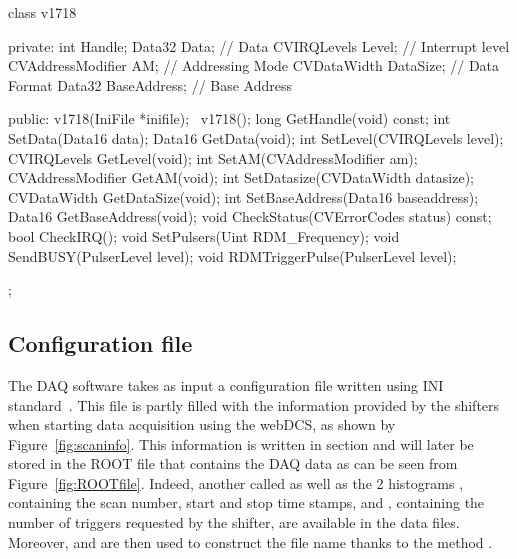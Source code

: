 	\begin{code}
    \begin{cppcode}
class v1718{
    private:
        int               Handle;
        Data32            Data;           // Data
        CVIRQLevels       Level;          // Interrupt level
        CVAddressModifier AM;             // Addressing Mode
        CVDataWidth       DataSize;       // Data Format
        Data32            BaseAddress;    // Base Address

    public:
        v1718(IniFile *inifile);
        ~v1718();
        long              GetHandle(void) const;
        int               SetData(Data16 data);
        Data16            GetData(void);
        int               SetLevel(CVIRQLevels level);
        CVIRQLevels       GetLevel(void);
        int               SetAM(CVAddressModifier am);
        CVAddressModifier GetAM(void);
        int               SetDatasize(CVDataWidth datasize);
        CVDataWidth       GetDataSize(void);
        int               SetBaseAddress(Data16 baseaddress);
        Data16            GetBaseAddress(void);
        void              CheckStatus(CVErrorCodes status) const;
        bool              CheckIRQ();
        void              SetPulsers(Uint RDM_Frequency);
        void              SendBUSY(PulserLevel level);
        void              RDMTriggerPulse(PulserLevel level);
};
    \end{cppcode}
	\label{cpp:v1718}
	\vspace{5mm}
    \end{code}

    \subsection{Configuration file}
    \label{app1:ssec:inifile}
    
    The DAQ software takes as input a configuration file written using INI standard~\cite{INI}. This file is partly filled with the information provided by the shifters when starting data acquisition using the webDCS, as shown by Figure~\ref{fig:scaninfo}. This information is written in section \iniinline{[General]} and will later be stored in the ROOT file that contains the DAQ data as can be seen from Figure~\ref{fig:ROOTfile}. Indeed, another  called  as well as the 2 histograms , containing the scan number, start and stop time stamps, and , containing the number of triggers requested by the shifter, are available in the data files. Moreover,  and  are then used to construct the file name thanks to the method .
    
